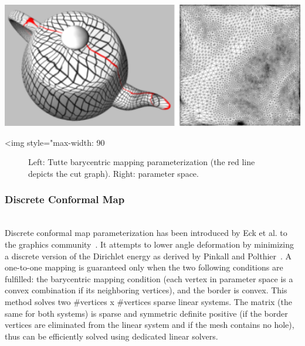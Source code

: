 \begin{center}
    \label{Surface_mesh_parameterization-fig-uniform}
    \begin{ccTexOnly}
      \includegraphics[width=1.0\textwidth]{Surface_mesh_parameterization/uniform}
    \end{ccTexOnly}
    \begin{ccHtmlOnly}
        <img style="max-width: 90%
    \end{ccHtmlOnly}
    \begin{figure}[ht]
        \caption{Left: Tutte barycentric mapping parameterization (the red
                 line depicts the cut graph). Right: parameter space.}
    \end{figure}
\end{center}


\subsubsection{Discrete Conformal Map}

  \\

Discrete conformal map parameterization has been introduced by Eck et
al. to the graphics community~\cite{cgal:eddhls-maam-95}. It attempts to
lower angle deformation by minimizing a discrete version of the
Dirichlet energy as derived by Pinkall and
Polthier~\cite{cgal:pp-cdmsc-93}. A one-to-one mapping is guaranteed
only when the two following conditions are fulfilled: the barycentric mapping
condition (each vertex in parameter space is a convex combination if
its neighboring vertices), and the border is convex.
This method solves two \#vertices x \#vertices sparse linear
systems. The matrix (the same for both systems) is sparse and symmetric definite
positive (if the border vertices are eliminated from the linear system
and if the mesh contains no hole),
thus can be efficiently solved using dedicated linear solvers.

